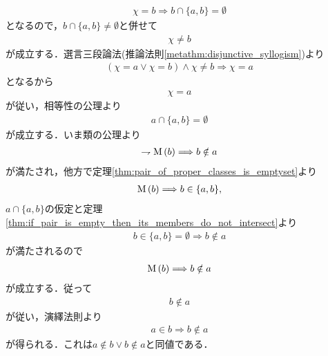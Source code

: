 \begin{prf}
\begin{description}
\begin{align}
					\chi = b \Longrightarrow b \cap \{a,b\} = \emptyset
				\end{align}
				となるので，$b \cap \{a,b\} \neq \emptyset$と併せて
				\begin{align}
					\chi \neq b
				\end{align}
				が成立する．選言三段論法(推論法則\ref{metathm:disjunctive_syllogism})より
				\begin{align}
					(\chi = a \vee \chi = b) \wedge \chi \neq b \Longrightarrow \chi = a
				\end{align}
				となるから
				\begin{align}
					\chi = a
				\end{align}
				が従い，相等性の公理より
				\begin{align}
					a \cap \{a,b\} = \emptyset
				\end{align}
				が成立する．いま類の公理より
				\begin{align}
					\rightharpoondown \operatorname*{M}\left(b\right) \Longrightarrow b \notin a
				\end{align}
				が満たされ，他方で定理\ref{thm:pair_of_proper_classes_is_emptyset}より
				\begin{align}
					\operatorname*{M}\left(b\right) \Longrightarrow b \in \{a,b\},
				\end{align}
				$a \cap \{a,b\}$の仮定と定理\ref{thm:if_pair_is_empty_then_its_members_do_not_intersect}より
				\begin{align}
					b \in \{a,b\} = \emptyset \Longrightarrow b \notin a
				\end{align}
				が満たされるので
				\begin{align}
					\operatorname*{M}\left(b\right) \Longrightarrow b \notin a
				\end{align}
				が成立する．従って
				\begin{align}
					b \notin a
				\end{align}
				が従い，演繹法則より
				\begin{align}
					a \in b \Longrightarrow b \notin a
				\end{align}
				が得られる．これは$a \notin b \vee b \notin a$と同値である．
				

\end{description}
\end{prf}
